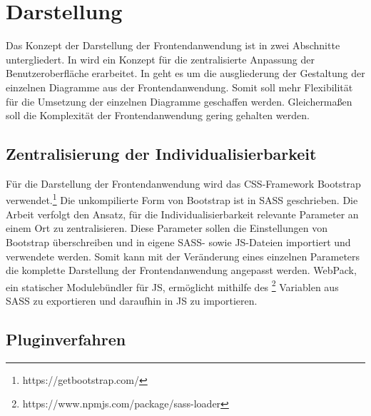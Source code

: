 \section{Darstellung}
\label{sec:darstellung}
Das Konzept der Darstellung der Frontendanwendung ist in zwei Abschnitte untergliedert.
In  wird ein Konzept für die
zentralisierte Anpassung der Benutzeroberfläche erarbeitet. In 
geht es um die ausgliederung der Gestaltung der einzelnen Diagramme aus der Frontendanwendung.
Somit soll mehr Flexibilität für die Umsetzung der einzelnen Diagramme geschaffen werden.
Gleichermaßen soll die Komplexität der Frontendanwendung gering gehalten werden.

\subsection{Zentralisierung der Individualisierbarkeit}
\label{subsec:zentralisierungderindividualisierbarkeit}
Für die Darstellung der Frontendanwendung wird das CSS-Framework Bootstrap verwendet.\footnote{https://getbootstrap.com/}
Die unkompilierte Form von Bootstrap ist in SASS geschrieben\cite[2. Abschnitt]{Bootstrap4punkt4}.
Die Arbeit verfolgt den Ansatz, für die Individualisierbarkeit relevante Parameter an einem Ort
zu zentralisieren. Diese Parameter sollen die Einstellungen von Bootstrap überschreiben und
in eigene SASS- sowie JS-Dateien importiert und verwendete werden. Somit kann mit der Veränderung
eines einzelnen Parameters die komplette Darstellung der Frontendanwendung angepasst werden.
WebPack, ein statischer Modulebündler für JS, ermöglicht mithilfe des \footnote{https://www.npmjs.com/package/sass-loader} Variablen
aus SASS zu exportieren und daraufhin in JS zu importieren\cite{ShareSCSSwithJS}.

\subsection{Pluginverfahren}
\label{subsec:pluginverfahren}

